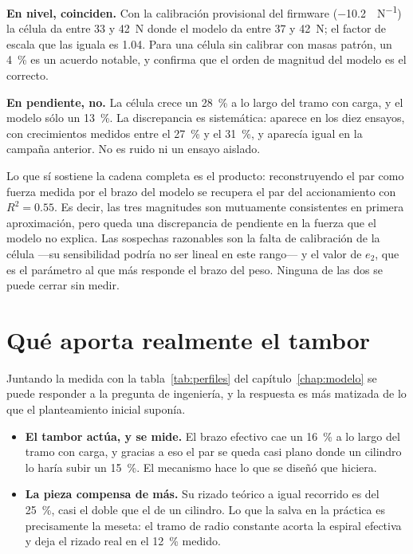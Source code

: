 \textbf{En nivel, coinciden.} Con la calibración provisional del firmware
(\SI{-10.2}{\uacc\per\newton}) la célula da entre \num{33} y \SI{42}{\newton} donde el modelo da
entre \num{37} y \SI{42}{\newton}; el factor de escala que las iguala es \num{1.04}. Para una célula
sin calibrar con masas patrón, un \SI{4}{\percent} es un acuerdo notable, y confirma que el orden
de magnitud del modelo es el correcto.

\textbf{En pendiente, no.} La célula crece un \SI{28}{\percent} a lo largo del tramo con carga, y el
modelo sólo un \SI{13}{\percent}. La discrepancia es sistemática: aparece en los diez ensayos, con
crecimientos medidos entre el \SI{27}{\percent} y el \SI{31}{\percent}, y aparecía igual en la
campaña anterior. No es ruido ni un ensayo aislado.

Lo que sí sostiene la cadena completa es el producto: reconstruyendo el par como fuerza medida por el
brazo del modelo se recupera el par del accionamiento con $R^2 = \num{0.55}$. Es decir, las tres
magnitudes son mutuamente consistentes en primera aproximación, pero queda una discrepancia de
pendiente en la fuerza que el modelo no explica. Las sospechas razonables son la falta de
calibración de la célula ---su sensibilidad podría no ser lineal en este rango--- y el valor de
$e_2$, que es el parámetro al que más responde el brazo del peso. Ninguna de las dos se puede cerrar
sin medir. 

\section{Qué aporta realmente el tambor}
\label{sec:res-aporta}

Juntando la medida con la tabla~\ref{tab:perfiles} del capítulo~\ref{chap:modelo} se puede responder
a la pregunta de ingeniería, y la respuesta es más matizada de lo que el planteamiento inicial
suponía.

\begin{itemize}
  \item \textbf{El tambor actúa, y se mide.} El brazo efectivo cae un \SI{16}{\percent} a lo largo
        del tramo con carga, y gracias a eso el par se queda casi plano donde un cilindro lo haría
        subir un \SI{15}{\percent}. El mecanismo hace lo que se diseñó que hiciera.
  \item \textbf{La pieza compensa de más.} Su rizado teórico a igual recorrido es del
        \SI{25}{\percent}, casi el doble que el de un cilindro. Lo que la salva en la práctica es
        precisamente la meseta: el tramo de radio constante acorta la espiral efectiva y deja el
        rizado real en el \SI{12}{\percent} medido.
\end{itemize}

